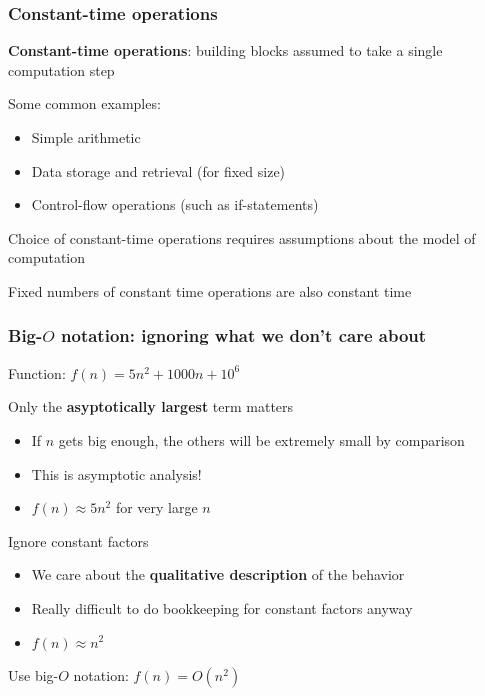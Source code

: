 \documentclass[aspectratio=169,hyperref={bookmarks=false,urlcolor=blue,colorlinks=true},10pt]{beamer}
\begin{document}
\begin{frame}
  \frametitle{Constant-time operations}

  \textbf{Constant-time operations}: building blocks assumed to take a single computation step

  \vspace{\baselineskip}

  \pause
  Some common examples:
  \begin{itemize}
  \item Simple arithmetic
  \item Data storage and retrieval (for fixed size)
  \item Control-flow operations (such as if-statements)
  \end{itemize}

  \vspace{\baselineskip}

  \pause
  Choice of constant-time operations requires assumptions about the model of computation

  \vspace{\baselineskip}

  \pause
  Fixed numbers of constant time operations are also constant time
\end{frame}

\begin{frame}[fragile]
  \frametitle{Big-$O$ notation: ignoring what we don't care about}

  Function: $f(n) = 5n^2 + 1000n + 10^6$

  \vspace{\baselineskip}

  \pause
  Only the \textbf{asyptotically largest} term matters
  \begin{itemize}
  \item If $n$ gets big enough, the others will be extremely small by comparison
  \item This is asymptotic analysis!
  \item $f(n) \approx 5n^2$ for very large $n$
  \end{itemize}

  \vspace{\baselineskip}

  \pause
  Ignore constant factors
  \begin{itemize}
  \item We care about the \textbf{qualitative description} of the behavior
  \item Really difficult to do bookkeeping for constant factors anyway
  \item $f(n) \approx n^2$
  \end{itemize}

  \vspace{\baselineskip}

  \pause
  Use big-$O$ notation: $f(n) = O(n^2)$
\end{frame}
\end{document}
